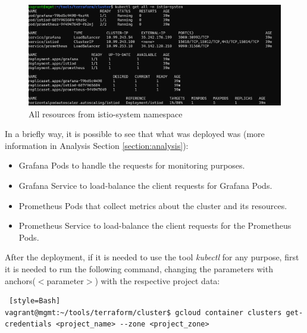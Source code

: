 \documentclass[12pt,a4paper,oneside]{report}
\begin{document}
\begin{figure}[h]
    \centering
    \includegraphics[width=1.0\textwidth]{./pictures/kubctl-get-all-istio-system-ns.png}
    \caption{All resources from istio-system namespace}
    \label{fig:all-resources-istio-namespace}
\end{figure}

In a briefly way, it is possible to see that what was deployed was (more information in Analysis Section \ref{section:analysis}):
\begin{itemize}
    \item Grafana Pods to handle the requests for monitoring purposes.
    \item Grafana Service to load-balance the client requests for Grafana Pods.
    \item Prometheus Pods that collect metrics about the cluster and its resources.
    \item Prometheus Service to load-balance the client requests for the Prometheus Pods.
\end{itemize}

After the deployment, if it is needed to use the tool \textit{kubectl} for any purpose, first it is needed to run the following command, changing the parameters with anchors($<$parameter$>$) with the respective project data:
\begin{lstlisting} [style=Bash]
vagrant@mgmt:~/tools/terraform/cluster$ gcloud container clusters get-credentials <project_name> --zone <project_zone>
\end{lstlisting}
\end{document}
